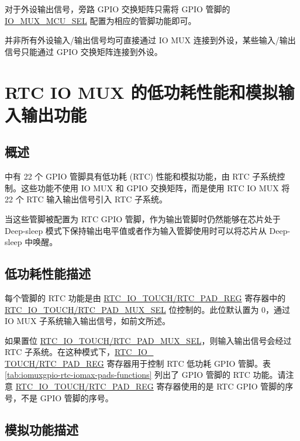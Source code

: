 \documentclass[main\_\_CN.tex]{subfiles}
\begin{document}
对于外设输出信号，旁路 GPIO 交换矩阵只需将 GPIO 管脚的 \hyperref[fielddesc:IOMUXMCUSEL]{IO\_MUX\_MCU\_SEL} 配置为相应的管脚功能即可。

\begin{tiplisting}
并非所有外设输入/输出信号均可直接通过 IO MUX 连接到外设，某些输入/输出信号只能通过 GPIO 交换矩阵连接到外设。
\end{tiplisting}

\section{RTC IO MUX 的低功耗性能和模拟输入输出功能}

\subsection{概述}

\chipname{} 中有 22 个 GPIO 管脚具有低功耗 (RTC) 性能和模拟功能，由 RTC 子系统控制。这些功能不使用 IO MUX 和 GPIO 交换矩阵，而是使用 RTC IO MUX 将 22 个 RTC 输入输出信号引入 RTC 子系统。

当这些管脚被配置为 RTC GPIO 管脚，作为输出管脚时仍然能够在芯片处于 Deep-sleep 模式下保持输出电平值或者作为输入管脚使用时可以将芯片从 Deep-sleep 中唤醒。

\subsection{低功耗性能描述}

每个管脚的 RTC 功能是由 \hyperref[regdesc:RTCIOTOUCHPADNREG]{RTC\_IO\_TOUCH/RTC\_PAD\_REG} 寄存器中的 \hyperref[fielddesc:RTCIOTOUCHPADNMUXSEL]{RTC\_IO\_TOUCH/RTC\_PAD\_MUX\_SEL} 位控制的。此位默认置为 0，通过 IO MUX 子系统输入输出信号，如前文所述。

如果置位 \hyperref[fielddesc:RTCIOTOUCHPADNMUXSEL]{RTC\_IO\_TOUCH/RTC\_PAD\_MUX\_SEL}，则输入输出信号会经过 RTC 子系统。在这种模式下，\hyperref[regdesc:RTCIOTOUCHPADNREG]{RTC\_IO\_\\TOUCH/RTC\_PAD\_REG} 寄存器用于控制 RTC 低功耗 GPIO 管脚。表 \ref{tab:iomuxgpio-rtc-iomax-pads-functions} 列出了 GPIO 管脚的 RTC 功能。请注意 \hyperref[regdesc:RTCIOTOUCHPADNREG]{RTC\_IO\_TOUCH/RTC\_PAD\_REG} 寄存器使用的是 RTC GPIO 管脚的序号，不是 GPIO 管脚的序号。

\subsection{模拟功能描述}
\end{document}
